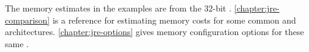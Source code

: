 The memory estimates in the examples are from the 32-bit \oracle
\javasix \jre.
\autoref{chapter:jre-comparison} is a reference for estimating memory costs
for some common \jres and architectures.
\autoref{chapter:jre-options} gives memory configuration options for these same
\jres.





\begin{comment}
microscopic estimating (field-level counting), and accounting to predict
scale

EC diagram, bloat factory, scaling, 

lifetime: sometimes it's not a leak, just a consumption problem (in-memory
design, didn't fit)

sometimes optimizations cost: making a side object for rarely used fields; when
is it useful sharing immutable data (how much sharing before factoring it out
is worthwhile)

what java gives you, what it doesn't, some things are kinda hard to use; java
makes it hard for you

you actually have control



preface

things are hard to change at some point. it's easy to get to an irreconciliable
spot.

intro

why isn't this just for systems programmers making b-trees? this is about
everyday application development

i have GC, why care about lifetime?
i have standard data structures, why care about data model design?

data modeL: entites and relations

visual presentation of density
[flyweight: canonicalizing map]
\end{comment}
